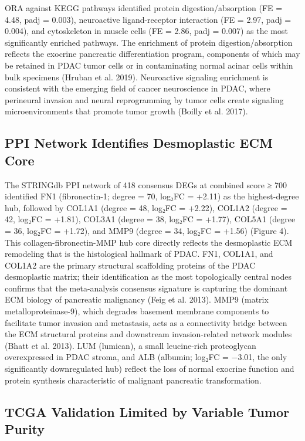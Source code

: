 \documentclass[
  12pt,
]{article}
\begin{document}
ORA against KEGG pathways identified protein digestion/absorption (FE =
4.48, padj = 0.003), neuroactive ligand-receptor interaction (FE = 2.97,
padj = 0.004), and cytoskeleton in muscle cells (FE = 2.86, padj =
0.007) as the most significantly enriched pathways. The enrichment of
protein digestion/absorption reflects the exocrine pancreatic
differentiation program, components of which may be retained in PDAC
tumor cells or in contaminating normal acinar cells within bulk
specimens (Hruban et al. 2019). Neuroactive signaling enrichment is
consistent with the emerging field of cancer neuroscience in PDAC, where
perineural invasion and neural reprogramming by tumor cells create
signaling microenvironments that promote tumor growth (Boilly et al.
2017).

\subsection{PPI Network Identifies Desmoplastic ECM
Core}\label{ppi-network-identifies-desmoplastic-ecm-core}

The STRINGdb PPI network of 418 consensus DEGs at combined score ≥ 700
identified FN1 (fibronectin-1; degree = 70, log₂FC = +2.11) as the
highest-degree hub, followed by COL1A1 (degree = 48, log₂FC = +2.22),
COL1A2 (degree = 42, log₂FC = +1.81), COL3A1 (degree = 38, log₂FC =
+1.77), COL5A1 (degree = 36, log₂FC = +1.72), and MMP9 (degree = 34,
log₂FC = +1.56) (Figure 4). This collagen-fibronectin-MMP hub core
directly reflects the desmoplastic ECM remodeling that is the
histological hallmark of PDAC. FN1, COL1A1, and COL1A2 are the primary
structural scaffolding proteins of the PDAC desmoplastic matrix; their
identification as the most topologically central nodes confirms that the
meta-analysis consensus signature is capturing the dominant ECM biology
of pancreatic malignancy (Feig et al. 2013). MMP9 (matrix
metalloproteinase-9), which degrades basement membrane components to
facilitate tumor invasion and metastasis, acts as a connectivity bridge
between the ECM structural proteins and downstream invasion-related
network modules (Bhatt et al. 2013). LUM (lumican), a small leucine-rich
proteoglycan overexpressed in PDAC stroma, and ALB (albumin; log₂FC =
−3.01, the only significantly downregulated hub) reflect the loss of
normal exocrine function and protein synthesis characteristic of
malignant pancreatic transformation.

\subsection{TCGA Validation Limited by Variable Tumor
Purity}\label{tcga-validation-limited-by-variable-tumor-purity}
\end{document}
